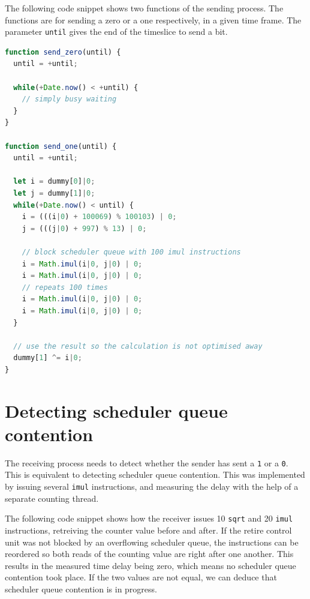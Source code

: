 \documentclass[11pt,
  titlepage=false,
]{scrreprt}
\begin{document}
The following code snippet shows two functions of the sending process.
The functions are for sending a zero or a one respectively, in a given time frame.
The parameter \texttt{until} gives the end of the timeslice to send a bit.
\begin{lstlisting}[language=JavaScript]
function send_zero(until) {
  until = +until;

  while(+Date.now() < +until) {
    // simply busy waiting
  }
}

function send_one(until) {
  until = +until;

  let i = dummy[0]|0;
  let j = dummy[1]|0;
  while(+Date.now() < until) {
    i = (((i|0) + 100069) % 100103) | 0;
    j = (((j|0) + 997) % 13) | 0;

    // block scheduler queue with 100 imul instructions
    i = Math.imul(i|0, j|0) | 0;
    i = Math.imul(i|0, j|0) | 0;
    // repeats 100 times
    i = Math.imul(i|0, j|0) | 0;
    i = Math.imul(i|0, j|0) | 0;
  }

  // use the result so the calculation is not optimised away
  dummy[1] ^= i|0;
}
\end{lstlisting}

\section{Detecting scheduler queue contention}
\label{sec:detect-sqc}
The receiving process needs to detect whether the sender has sent a \texttt{1} or a \texttt{0}.
This is equivalent to detecting scheduler queue contention.
This was implemented by issuing several \texttt{imul} instructions,
and measuring the delay with the help of a separate counting thread.

The following code snippet shows how the receiver issues 10 \texttt{sqrt} and 20 \texttt{imul} instructions,
retreiving the counter value before and after.
If the retire control unit was not blocked by an overflowing scheduler queue,
the instructions can be reordered so both reads of the counting value are right after one another.
This results in the measured time delay being zero, which means no scheduler queue contention took place.
If the two values are not equal, we can deduce that scheduler queue contention is in progress.
\end{document}
